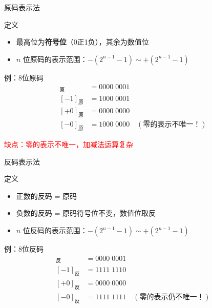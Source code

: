 \documentclass[10pt, aspectratio=169]{beamer}
\begin{document}
\begin{frame}{原码表示法}
    \begin{block}{定义}
        \begin{itemize}
            \item 最高位为\textbf{符号位}（0正1负），其余为数值位
            \item $n$ 位原码的表示范围：$-(2^{n-1} - 1) \sim +(2^{n-1} - 1)$
        \end{itemize}
    \end{block}
    \vspace{0.3em}
    \begin{exampleblock}{例：8位原码}
        \begin{align*}
            [+1]_{\text{原}} &= 0000\;0001 \\
            [-1]_{\text{原}} &= 1000\;0001 \\
            [+0]_{\text{原}} &= 0000\;0000 \\
            [-0]_{\text{原}} &= 1000\;0000 \quad (\text{零的表示不唯一！})
        \end{align*}
    \end{exampleblock}
    \vspace{0.3em}
    \begin{center}
        \textcolor{red}{缺点：零的表示不唯一，加减法运算复杂}
    \end{center}
\end{frame}

\begin{frame}{反码表示法}
    \begin{block}{定义}
        \begin{itemize}
            \item 正数的反码 = 原码
            \item 负数的反码 = 原码符号位不变，数值位取反
            \item $n$ 位反码的表示范围：$-(2^{n-1} - 1) \sim +(2^{n-1} - 1)$
        \end{itemize}
    \end{block}
    \vspace{0.3em}
    \begin{exampleblock}{例：8位反码}
        \begin{align*}
            [+1]_{\text{反}} &= 0000\;0001 \\
            [-1]_{\text{反}} &= 1111\;1110 \\
            [+0]_{\text{反}} &= 0000\;0000 \\
            [-0]_{\text{反}} &= 1111\;1111 \quad (\text{零的表示仍不唯一！})
        \end{align*}
    \end{exampleblock}
\end{frame}
\end{document}
